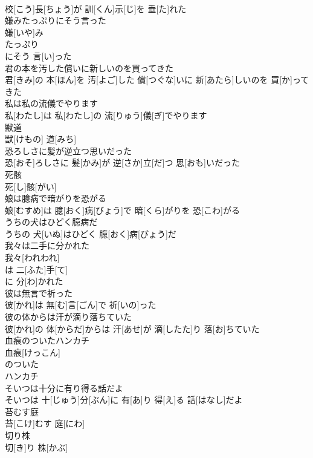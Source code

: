 \documentclass[8pt]{extreport}
\begin{document}
\begin{CJK}{UTF8}{min}
\\	校[こう]長[ちょう]が 訓[くん]示[じ]を 垂[た]れた
\\	嫌みたっぷりにそう言った	
\\	嫌[いや]み 
\\	たっぷり 
\\	にそう 言[い]った 
\\	君の本を汚した償いに新しいのを買ってきた	
\\	君[きみ]の 本[ほん]を 汚[よご]した 償[つぐな]いに 新[あたら]しいのを 買[か]ってきた
\\	私は私の流儀でやります	
\\	私[わたし]は 私[わたし]の 流[りゅう]儀[ぎ]でやります
\\	獣道	
\\	獣[けもの] 道[みち]
\\	恐ろしさに髪が逆立つ思いだった	
\\	恐[おそ]ろしさに 髪[かみ]が 逆[さか]立[だ]つ 思[おも]いだった
\\	死骸	
\\	死[し]骸[がい]
\\	娘は臆病で暗がりを恐がる	
\\	娘[むすめ]は 臆[おく]病[びょう]で 暗[くら]がりを 恐[こわ]がる
\\	うちの犬はひどく臆病だ	
\\	うちの 犬[いぬ]はひどく 臆[おく]病[びょう]だ
\\	我々は二手に分かれた	
\\	我々[われわれ]
\\	は 二[ふた]手[て]
\\	に 分[わ]かれた 
\\	彼は無言で祈った	
\\	彼[かれ]は 無[む]言[ごん]で 祈[いの]った
\\	彼の体からは汗が滴り落ちていた	
\\	彼[かれ]の 体[からだ]からは 汗[あせ]が 滴[したた]り 落[お]ちていた
\\	血痕のついたハンカチ	
\\	血痕[けっこん]
\\	のついた 
\\	ハンカチ 
\\	そいつは十分に有り得る話だよ	
\\	そいつは 十[じゅう]分[ぶん]に 有[あ]り 得[え]る 話[はなし]だよ
\\	苔むす庭	
\\	苔[こけ]むす 庭[にわ]
\\	切り株	
\\	切[き]り 株[かぶ]

\end{CJK}
\end{document}
